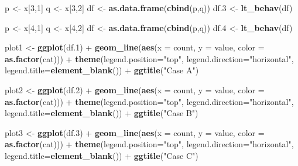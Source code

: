 \documentclass[]{article}
\newenvironment{Shaded}{\begin{snugshade}}{\end{snugshade}}
\newcommand{\KeywordTok}[1]{\textcolor[rgb]{0.13,0.29,0.53}{\textbf{{#1}}}}
\newcommand{\DataTypeTok}[1]{\textcolor[rgb]{0.13,0.29,0.53}{{#1}}}
\newcommand{\DecValTok}[1]{\textcolor[rgb]{0.00,0.00,0.81}{{#1}}}
\newcommand{\FloatTok}[1]{\textcolor[rgb]{0.00,0.00,0.81}{{#1}}}
\newcommand{\StringTok}[1]{\textcolor[rgb]{0.31,0.60,0.02}{{#1}}}
\newcommand{\NormalTok}[1]{{#1}}
\begin{document}
\begin{Shaded}
\begin{Highlighting}[]
\NormalTok{p <-}\StringTok{ }\NormalTok{x[}\DecValTok{3}\NormalTok{,}\DecValTok{1}\NormalTok{]}
\NormalTok{q <-}\StringTok{ }\NormalTok{x[}\DecValTok{3}\NormalTok{,}\DecValTok{2}\NormalTok{]}
\NormalTok{df <-}\StringTok{ }\KeywordTok{as.data.frame}\NormalTok{(}\KeywordTok{cbind}\NormalTok{(p,q))}
\NormalTok{df}\FloatTok{.3} \NormalTok{<-}\StringTok{ }\KeywordTok{lt_behav}\NormalTok{(df)}

\NormalTok{p <-}\StringTok{ }\NormalTok{x[}\DecValTok{4}\NormalTok{,}\DecValTok{1}\NormalTok{]}
\NormalTok{q <-}\StringTok{ }\NormalTok{x[}\DecValTok{4}\NormalTok{,}\DecValTok{2}\NormalTok{]}
\NormalTok{df <-}\StringTok{ }\KeywordTok{as.data.frame}\NormalTok{(}\KeywordTok{cbind}\NormalTok{(p,q))}
\NormalTok{df}\FloatTok{.4} \NormalTok{<-}\StringTok{ }\KeywordTok{lt_behav}\NormalTok{(df)}


\NormalTok{plot1 <-}\StringTok{ }\KeywordTok{ggplot}\NormalTok{(df}\FloatTok{.1}\NormalTok{) +}\StringTok{ }
\StringTok{         }\KeywordTok{geom_line}\NormalTok{(}\KeywordTok{aes}\NormalTok{(}\DataTypeTok{x =} \NormalTok{count, }\DataTypeTok{y =} \NormalTok{value, }\DataTypeTok{color =} \KeywordTok{as.factor}\NormalTok{(cat))) +}\StringTok{ }
\StringTok{         }\KeywordTok{theme}\NormalTok{(}\DataTypeTok{legend.position=}\StringTok{"top"}\NormalTok{, }\DataTypeTok{legend.direction=}\StringTok{"horizontal"}\NormalTok{, }\DataTypeTok{legend.title=}\KeywordTok{element_blank}\NormalTok{()) +}
\StringTok{         }\KeywordTok{ggtitle}\NormalTok{(}\StringTok{"Case A"}\NormalTok{)}

\NormalTok{plot2 <-}\StringTok{ }\KeywordTok{ggplot}\NormalTok{(df}\FloatTok{.2}\NormalTok{) +}\StringTok{ }
\StringTok{         }\KeywordTok{geom_line}\NormalTok{(}\KeywordTok{aes}\NormalTok{(}\DataTypeTok{x =} \NormalTok{count, }\DataTypeTok{y =} \NormalTok{value, }\DataTypeTok{color =} \KeywordTok{as.factor}\NormalTok{(cat))) +}\StringTok{ }
\StringTok{         }\KeywordTok{theme}\NormalTok{(}\DataTypeTok{legend.position=}\StringTok{"top"}\NormalTok{, }\DataTypeTok{legend.direction=}\StringTok{"horizontal"}\NormalTok{, }\DataTypeTok{legend.title=}\KeywordTok{element_blank}\NormalTok{()) +}
\StringTok{         }\KeywordTok{ggtitle}\NormalTok{(}\StringTok{"Case B"}\NormalTok{)}

\NormalTok{plot3 <-}\StringTok{ }\KeywordTok{ggplot}\NormalTok{(df}\FloatTok{.3}\NormalTok{) +}\StringTok{ }
\StringTok{         }\KeywordTok{geom_line}\NormalTok{(}\KeywordTok{aes}\NormalTok{(}\DataTypeTok{x =} \NormalTok{count, }\DataTypeTok{y =} \NormalTok{value, }\DataTypeTok{color =} \KeywordTok{as.factor}\NormalTok{(cat))) +}\StringTok{ }
\StringTok{         }\KeywordTok{theme}\NormalTok{(}\DataTypeTok{legend.position=}\StringTok{"top"}\NormalTok{, }\DataTypeTok{legend.direction=}\StringTok{"horizontal"}\NormalTok{, }\DataTypeTok{legend.title=}\KeywordTok{element_blank}\NormalTok{()) +}
\StringTok{         }\KeywordTok{ggtitle}\NormalTok{(}\StringTok{"Case C"}\NormalTok{)}


\end{Highlighting}
\end{Shaded}
\end{document}
